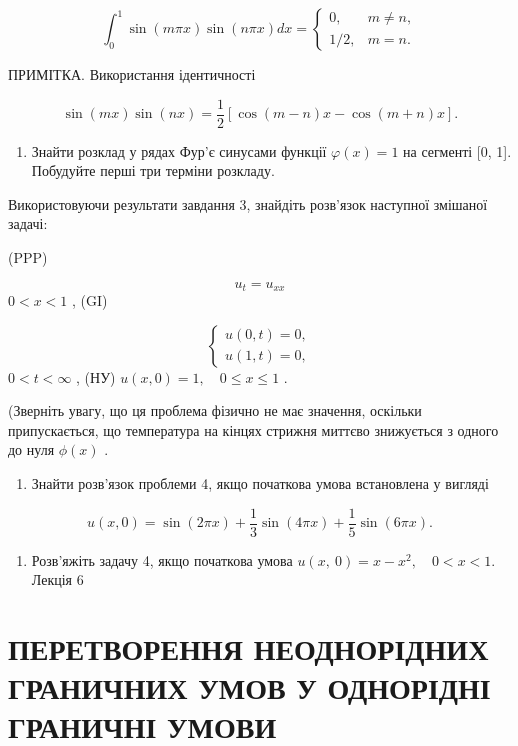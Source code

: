 \documentclass[
  ukrainian,
]{article}
\providecommand{\tightlist}{%
  \setlength{\itemsep}{0pt}\setlength{\parskip}{0pt}}
\begin{document}
\[\int_0^1 \sin(m\pi x) \sin(n\pi x) dx = \begin{cases} 0, & m \neq n, \\ 1/2, & m = n. \end{cases}\]

ПРИМІТКА. Використання ідентичності

\[\sin(mx)\sin(nx) = \frac{1}{2}[\cos(m-n)x - \cos(m+n)x].\]

\begin{enumerate}
\def\labelenumi{\arabic{enumi}.}
\setcounter{enumi}{2}
\tightlist
\item
  Знайти розклад у рядах Фур'є синусами функції \(\varphi(x) = 1\) на
  сегменті {[}0, 1{]}. Побудуйте перші три терміни розкладу.
\end{enumerate}

Використовуючи результати завдання 3, знайдіть розв'язок наступної
змішаної задачі:

(PPP)

\[u_t = u_{xx}\] \(0 < x < 1\) , (GI)

\[\begin{cases} u(0, t) = 0, \\ u(1, t) = 0, \end{cases}\]
\(0 < t < \infty\) , (НУ) \(u(x, 0) = 1, \quad 0 \le x \le 1\) .

(Зверніть увагу, що ця проблема фізично не має значення, оскільки
припускається, що температура на кінцях стрижня миттєво знижується з
одного до нуля \(\phi(x)\) .

\begin{enumerate}
\def\labelenumi{\arabic{enumi}.}
\setcounter{enumi}{4}
\tightlist
\item
  Знайти розв'язок проблеми 4, якщо початкова умова встановлена у
  вигляді
\end{enumerate}

\[u(x, 0) = \sin(2\pi x) + \frac{1}{3}\sin(4\pi x) + \frac{1}{5}\sin(6\pi x).\]

\begin{enumerate}
\def\labelenumi{\arabic{enumi}.}
\setcounter{enumi}{5}
\tightlist
\item
  Розв'яжіть задачу 4, якщо початкова умова
  \(u\left( x,\ 0\right) =x-x^{2},\quad 0< x<1.\) Лекція 6
\end{enumerate}

\section{ПЕРЕТВОРЕННЯ НЕОДНОРІДНИХ ГРАНИЧНИХ УМОВ У ОДНОРІДНІ ГРАНИЧНІ
УМОВИ}\label{ux43fux435ux440ux435ux442ux432ux43eux440ux435ux43dux43dux44f-ux43dux435ux43eux434ux43dux43eux440ux456ux434ux43dux438ux445-ux433ux440ux430ux43dux438ux447ux43dux438ux445-ux443ux43cux43eux432-ux443-ux43eux434ux43dux43eux440ux456ux434ux43dux456-ux433ux440ux430ux43dux438ux447ux43dux456-ux443ux43cux43eux432ux438}
\end{document}
